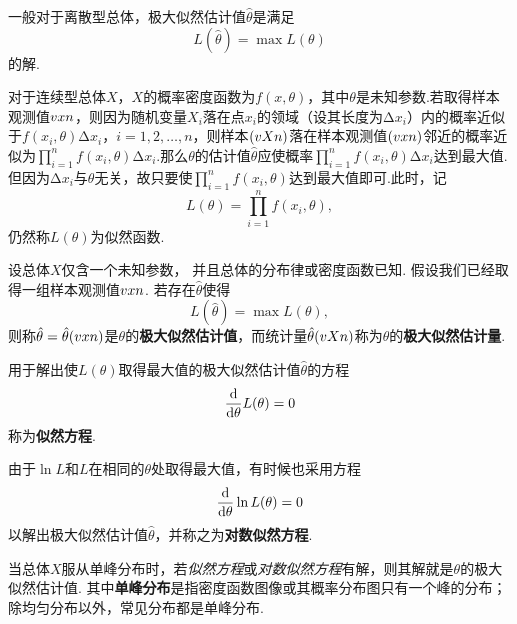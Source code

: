 一般对于离散型总体，极大似然估计值\(\hat{\theta}\)是满足\[
L(\hat{\theta}) = \max L(\theta)
\]的解.

对于连续型总体\(X\)，\(X\)的概率密度函数为\(f(x,\theta)\)，其中\(\theta\)是未知参数.若取得样本观测值\(v{x}{n}\)，则因为随机变量\(X_i\)落在点\(x_i\)的领域（设其长度为\(\increment x_i\)）内的概率近似于\(f(x_i,\theta) \increment x_i\)，\(i=1,2,\dotsc,n\)，则样本\((v{X}{n})\)落在样本观测值\((v{x}{n})\)邻近的概率近似为\(\prod\limits_{i=1}^n{f(x_i,\theta) \increment x_i}\).那么\(\theta\)的估计值\(\hat{\theta}\)应使概率\(\prod\limits_{i=1}^n{f(x_i,\theta) \increment x_i}\)达到最大值.但因为\(\increment x_i\)与\(\theta\)无关，故只要使\(\prod\limits_{i=1}^n{f(x_i,\theta)}\)达到最大值即可.此时，记\[
L(\theta) = \prod\limits_{i=1}^n{f(x_i,\theta)},
\]仍然称\(L(\theta)\)为似然函数.

\begin{definition}
设总体\(X\)仅含一个未知参数，%
并且总体的分布律或密度函数已知.
假设我们已经取得一组样本观测值\(v{x}{n}\).
若存在\(\hat{\theta}\)使得\[
L(\hat{\theta}) = \max L(\theta),
\]则称\(\hat{\theta} = \hat{\theta}(v{x}{n})\)是\(\theta\)的\textbf{极大似然估计值}，而统计量\(\hat{\theta}(v{X}{n})\)称为\(\theta\)的\textbf{极大似然估计量}.
\end{definition}

\begin{definition}
用于解出使\(L(\theta)\)取得最大值的极大似然估计值\(\hat{\theta}\)的方程\[
\dv{\theta} L(\theta) = 0
\]称为\textbf{似然方程}.

由于\(\ln L\)和\(L\)在相同的\(\theta\)处取得最大值，有时候也采用方程\[
\dv{\theta} \ln L(\theta) = 0
\]以解出极大似然估计值\(\hat{\theta}\)，并称之为\textbf{对数似然方程}.
\end{definition}

\begin{theorem}
当总体\(X\)服从单峰分布时，若\emph{似然方程}或\emph{对数似然方程}有解，则其解就是\(\theta\)的极大似然估计值.
其中\textbf{单峰分布}是指密度函数图像或其概率分布图只有一个峰的分布；除均匀分布以外，常见分布都是单峰分布.
\end{theorem}

